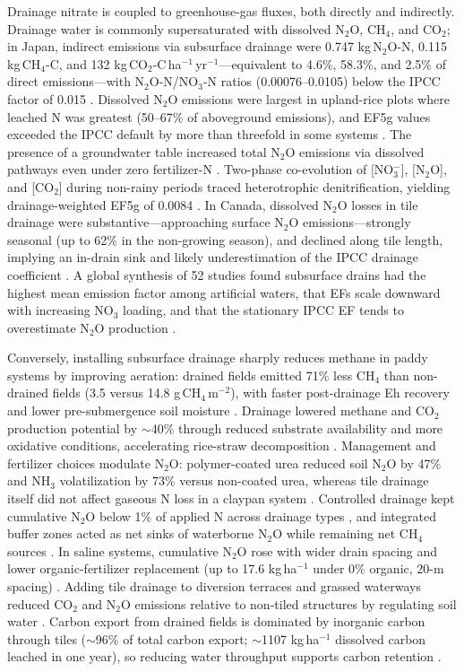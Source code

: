 Drainage nitrate is coupled to greenhouse-gas fluxes, both directly and indirectly. Drainage water is commonly supersaturated with dissolved N$_2$O, CH$_4$, and CO$_2$; in Japan, indirect emissions via subsurface drainage were 0.747 kg\,N$_2$O-N, 0.115 kg\,CH$_4$-C, and 132 kg\,CO$_2$-C\,ha$^{-1}$\,yr$^{-1}$---equivalent to 4.6\%, 58.3\%, and 2.5\% of direct emissions---with N$_2$O-N/NO$_3$-N ratios (0.00076--0.0105) below the IPCC factor of 0.015 \parencite{Sawamoto2003}. Dissolved N$_2$O emissions were largest in upland-rice plots where leached N was greatest (50--67\% of aboveground emissions), and EF5g values exceeded the IPCC default by more than threefold in some systems \parencite{Minamikawa2010}. The presence of a groundwater table increased total N$_2$O emissions via dissolved pathways even under zero fertilizer-N \parencite{Minamikawa2013}. Two-phase co-evolution of [NO$_3^-$], [N$_2$O], and [CO$_2$] during non-rainy periods traced heterotrophic denitrification, yielding drainage-weighted EF5g of 0.0084 \parencite{Minamikawa2015}. In Canada, dissolved N$_2$O losses in tile drainage were substantive---approaching surface N$_2$O emissions---strongly seasonal (up to 62\% in the non-growing season), and declined along tile length, implying an in-drain sink and likely underestimation of the IPCC drainage coefficient \parencite{Burton2024}. A global synthesis of 52 studies found subsurface drains had the highest mean emission factor among artificial waters, that EFs scale downward with increasing NO$_3$ loading, and that the stationary IPCC EF tends to overestimate N$_2$O production \parencite{Webb2021}.

Conversely, installing subsurface drainage sharply reduces methane in paddy systems by improving aeration: drained fields emitted 71\% less CH$_4$ than non-drained fields (3.5 versus 14.8 g\,CH$_4$\,m$^{-2}$), with faster post-drainage Eh recovery and lower pre-submergence soil moisture \parencite{Shiratori2007}. Drainage lowered methane and CO$_2$ production potential by $\sim$40\% through reduced substrate availability and more oxidative conditions, accelerating rice-straw decomposition \parencite{Furukawa2008}. Management and fertilizer choices modulate N$_2$O: polymer-coated urea reduced soil N$_2$O by 47\% and NH$_3$ volatilization by 73\% versus non-coated urea, whereas tile drainage itself did not affect gaseous N loss in a claypan system \parencite{Nash2015e}. Controlled drainage kept cumulative N$_2$O below 1\% of applied N across drainage types \parencite{Smith2019}, and integrated buffer zones acted as net sinks of waterborne N$_2$O while remaining net CH$_4$ sources \parencite{Carstensen2021}. In saline systems, cumulative N$_2$O rose with wider drain spacing and lower organic-fertilizer replacement (up to 17.6 kg\,ha$^{-1}$ under 0\% organic, 20-m spacing) \parencite{Zhai2023}. Adding tile drainage to diversion terraces and grassed waterways reduced CO$_2$ and N$_2$O emissions relative to non-tiled structures by regulating soil water \parencite{Driscoll2025}. Carbon export from drained fields is dominated by inorganic carbon through tiles ($\sim$96\% of total carbon export; $\sim$1107 kg\,ha$^{-1}$ dissolved carbon leached in one year), so reducing water throughput supports carbon retention \parencite{Schilling2023}.

